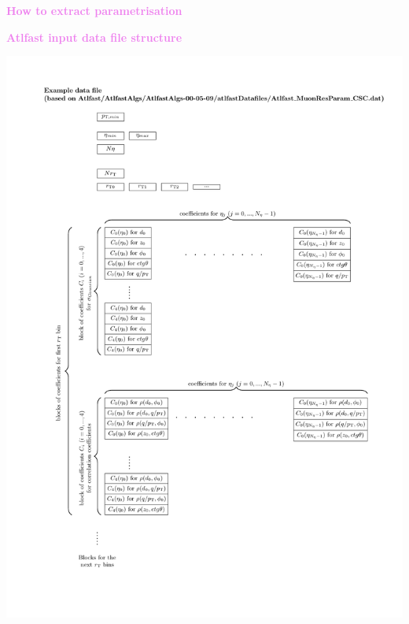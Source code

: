 \documentclass[8pt]{beamer}
\begin{document}
\begin{frame}
  \begin{center}
    {\textcolor{violet}{\LARGE{\bf How to extract parametrisation}}}
  \end{center}
\end{frame}




\begin{frame}
  \begin{center}
    {\textcolor{violet}{\LARGE{\bf Atlfast input data file structure}}}
  \end{center}
\end{frame}

\begin{frame}
\begin{center}
\vskip-10pt
  \includegraphics[height=1.1\textheight]{DataFile}
\end{center}
\end{frame}
\end{document}
